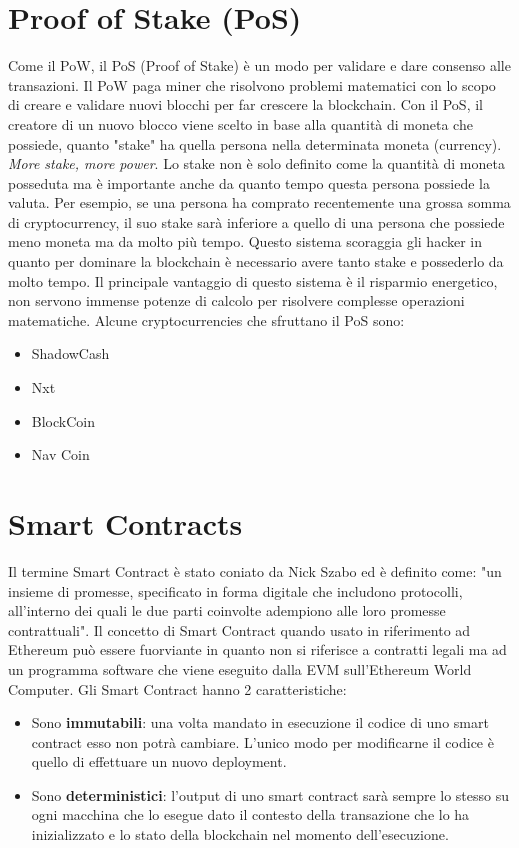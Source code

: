 \section{Proof of Stake (PoS)}
Come il PoW, il PoS (Proof of Stake) è un modo per validare e dare consenso alle
transazioni. Il PoW paga miner che risolvono problemi matematici con lo scopo di
creare e validare nuovi blocchi per far crescere la blockchain.
Con il PoS, il creatore  di un nuovo blocco viene scelto in base alla quantità
di moneta che possiede, quanto "stake" ha quella persona nella determinata moneta
(currency). \textit{More stake, more power}.
Lo stake non è solo definito come la quantità di moneta posseduta ma è importante
anche da quanto tempo questa persona possiede la valuta.
Per esempio, se una persona ha comprato recentemente una grossa somma di
cryptocurrency, il suo stake sarà inferiore a quello di una persona che possiede
meno moneta ma da molto più tempo.
Questo sistema scoraggia gli hacker in quanto per dominare la blockchain è
necessario avere tanto stake e possederlo da molto tempo.
Il principale vantaggio di questo sistema è il risparmio energetico,
non servono immense potenze di calcolo per risolvere complesse operazioni matematiche.
Alcune cryptocurrencies che sfruttano il PoS sono:

\begin{itemize}
      \item ShadowCash
      \item Nxt
      \item BlockCoin
      \item Nav Coin
\end{itemize}

\section{Smart Contracts}

Il termine Smart Contract è stato coniato da Nick Szabo ed è definito come:
"un insieme di promesse, specificato in forma digitale che includono protocolli,
all'interno dei quali le due parti coinvolte adempiono alle loro promesse
contrattuali".
Il concetto di Smart Contract quando usato in riferimento ad Ethereum può essere
fuorviante in quanto
non si riferisce a contratti legali ma ad un programma software che viene eseguito
dalla EVM sull'Ethereum
World Computer. Gli Smart Contract hanno 2 caratteristiche:

\begin{itemize}
      \item Sono \textbf{immutabili}: una volta mandato in esecuzione il
            codice di uno smart contract esso non potrà cambiare.
            L'unico modo per modificarne il codice è quello di effettuare un
            nuovo deployment.
      \item Sono \textbf{deterministici}: l'output di uno smart contract sarà
            sempre lo stesso su ogni macchina che lo esegue dato il contesto della
            transazione che lo ha inizializzato e lo stato della blockchain nel momento
            dell'esecuzione.
\end{itemize}

